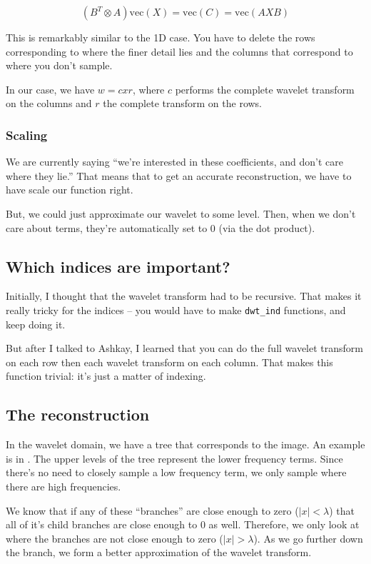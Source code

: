 \documentclass[leqno]{article}
\begin{document}
                $$(B^T \otimes A)\text{vec}(X) = \text{vec}(C) = \text{vec}(AXB) $$

                This is remarkably similar to the 1D case. You have to delete the rows corresponding to where the finer detail lies and the columns that correspond to where you don't sample.

                In our case, we have $w = c x r$, where $c$ performs the complete wavelet transform on the columns and $r$ the complete transform on the rows. 


                \subsubsection{Scaling}
                    We are currently saying ``we're interested in these coefficients, and don't care where they lie.'' That means that to get an accurate reconstruction, we have to have scale our function right.

                    But, we could just approximate our wavelet to some level. Then, when we don't care about terms, they're automatically set to 0 (via the dot product).


        \subsection{Which indices are important?}
            Initially, I thought that the wavelet transform had to be recursive. That makes it really tricky for the indices -- you would have to make \texttt{dwt\_ind} functions, and keep doing it. 

            But after I talked to Ashkay, I learned that you can do the full wavelet transform on each row then each wavelet transform on each column. That makes this function trivial: it's just a matter of indexing. 

        \subsection{The reconstruction}
            In the wavelet domain, we have a tree that corresponds to the image. An example is in . The upper levels of the tree represent the lower frequency terms. Since there's no need to closely sample a low frequency term, we only sample where there are high frequencies. 

            We know that if any of these ``branches'' are close enough to zero ($|x| < \lambda$) that all of it's child branches are close enough to 0 as well. Therefore, we only look at where the branches are not close enough to zero ($|x| > \lambda$). As we go further down the branch, we form a better approximation of the wavelet transform.
            
\end{document}
